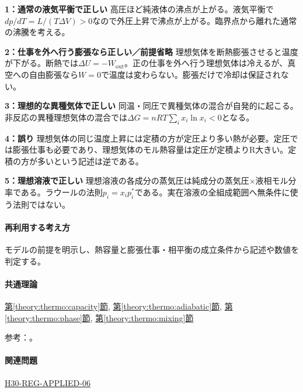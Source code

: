 \noindent\textbf{1：通常の液気平衡で正しい} 高圧ほど純液体の沸点が上がる。液気平衡で\(dp/dT=L/(T\Delta V)>0\)なので外圧上昇で沸点が上がる。臨界点から離れた通常の沸騰を考える。\par

\noindent\textbf{2：仕事を外へ行う膨張なら正しい／前提省略} 理想気体を断熱膨張させると温度が下がる。断熱では\(\Delta U=-W_{\mathrm{out}}\)。正の仕事を外へ行う理想気体は冷えるが、真空への自由膨張なら\(W=0\)で温度は変わらない。膨張だけで冷却は保証されない。\par

\noindent\textbf{3：理想的な異種気体で正しい} 同温・同圧で異種気体の混合が自発的に起こる。非反応の異種理想気体の混合では\(\Delta G=nRT\sum_i x_i\ln x_i<0\)となる。\par

\noindent\textbf{4：誤り} 理想気体の同じ温度上昇には定積の方が定圧より多い熱が必要。定圧では膨張仕事も必要であり、理想気体のモル熱容量は定圧が定積よりR大きい。定積の方が多いという記述は逆である。\par

\noindent\textbf{5：理想溶液で正しい} 理想溶液の各成分の蒸気圧は純成分の蒸気圧×液相モル分率である。ラウールの法則\(p_i=x_i p_i^*\)である。実在溶液の全組成範囲へ無条件に使う法則ではない。\par

\paragraph{再利用する考え方} モデルの前提を明示し、熱容量と膨張仕事・相平衡の成立条件から記述や数値を判定する。

\paragraph{共通理論} \hyperref[theory:thermo:capacity]{第\ref*{theory:thermo:capacity}節}, \hyperref[theory:thermo:adiabatic]{第\ref*{theory:thermo:adiabatic}節}, \hyperref[theory:thermo:phase]{第\ref*{theory:thermo:phase}節}, \hyperref[theory:thermo:mixing]{第\ref*{theory:thermo:mixing}節}

\par 参考：\cite{mit_thermo_adiabatic2008,mit_clapeyron2008,mit_solutions2008}。

\paragraph{関連問題} \hyperref[q:h30-reg-applied-06]{H30-REG-APPLIED-06}

